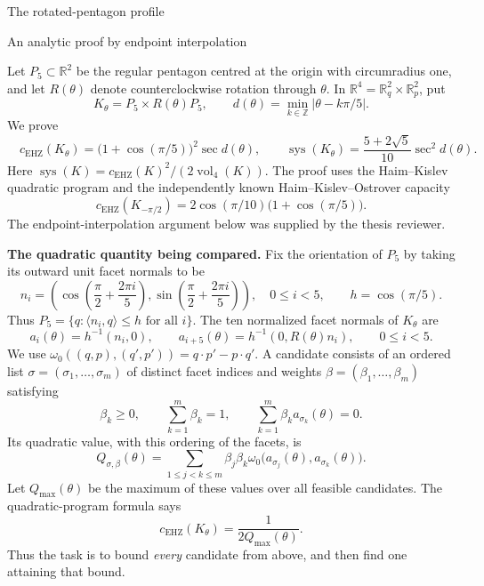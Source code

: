 \documentclass[11pt,a4paper]{article}
\newcommand{\R}{\mathbb R}
\newcommand{\capEHZ}{c_{\mathrm{EHZ}}}
\newcommand{\sys}{\operatorname{sys}}
\begin{document}
\begin{center}
  {\Large The rotated-pentagon profile}\par
  \small An analytic proof by endpoint interpolation
\end{center}

Let $P_5\subset\R^2$ be the regular pentagon centred at the origin with
circumradius one, and let $R(\theta)$ denote counterclockwise rotation through
$\theta$. In $\R^4=\R_q^2\times\R_p^2$, put
\[
 K_\theta=P_5\times R(\theta)P_5,
 \qquad
 d(\theta)=\min_{k\in\mathbb Z}|\theta-k\pi/5|.
\]
We prove
\[
 \boxed{\quad
 \capEHZ(K_\theta)=\bigl(1+\cos(\pi/5)\bigr)^2\sec d(\theta),
 \qquad
 \sys(K_\theta)=\frac{5+2\sqrt5}{10}\sec^2 d(\theta).
 \quad}
\]
Here $\sys(K)=\capEHZ(K)^2/(2\operatorname{vol}_4(K))$.
The proof uses the Haim--Kislev quadratic program and the independently
known Haim--Kislev--Ostrover capacity
\begin{equation}\label{eq:hko}
 \capEHZ(K_{-\pi/2})
 =2\cos(\pi/10)\bigl(1+\cos(\pi/5)\bigr).
\end{equation}
The endpoint-interpolation argument below was supplied by the thesis reviewer.

\textbf{The quadratic quantity being compared.}
Fix the orientation of $P_5$ by taking its outward unit facet normals to be
\[
 n_i=\left(\cos\left(\frac\pi2+\frac{2\pi i}{5}\right),
           \sin\left(\frac\pi2+\frac{2\pi i}{5}\right)\right),
 \quad 0\le i<5,
 \qquad h=\cos(\pi/5).
\]
Thus $P_5=\{q:\langle n_i,q\rangle\le h\text{ for all }i\}$.
The ten normalized facet normals of $K_\theta$ are
\[
 a_i(\theta)=h^{-1}(n_i,0),\qquad
 a_{i+5}(\theta)=h^{-1}(0,R(\theta)n_i),\qquad 0\le i<5.
\]
We use $\omega_0((q,p),(q',p'))=q\cdot p'-p\cdot q'$.
A candidate consists of an ordered list
$\sigma=(\sigma_1,\ldots,\sigma_m)$ of distinct facet indices and weights
$\beta=(\beta_1,\ldots,\beta_m)$ satisfying
\begin{equation}\label{eq:feasible}
 \beta_k\ge0,\qquad \sum_{k=1}^m\beta_k=1,
 \qquad \sum_{k=1}^m\beta_k a_{\sigma_k}(\theta)=0.
\end{equation}
Its quadratic value, with this ordering of the facets, is
\begin{equation}\label{eq:q}
 Q_{\sigma,\beta}(\theta)
 =\sum_{1\le j<k\le m}\beta_j\beta_k
       \omega_0\bigl(a_{\sigma_j}(\theta),a_{\sigma_k}(\theta)\bigr).
\end{equation}
Let $Q_{\max}(\theta)$ be the maximum of these values over all feasible
candidates. The quadratic-program formula says
\begin{equation}\label{eq:hk}
 \capEHZ(K_\theta)=\frac{1}{2Q_{\max}(\theta)}.
\end{equation}
Thus the task is to bound \emph{every} candidate from above, and then find
one attaining that bound.
\end{document}

